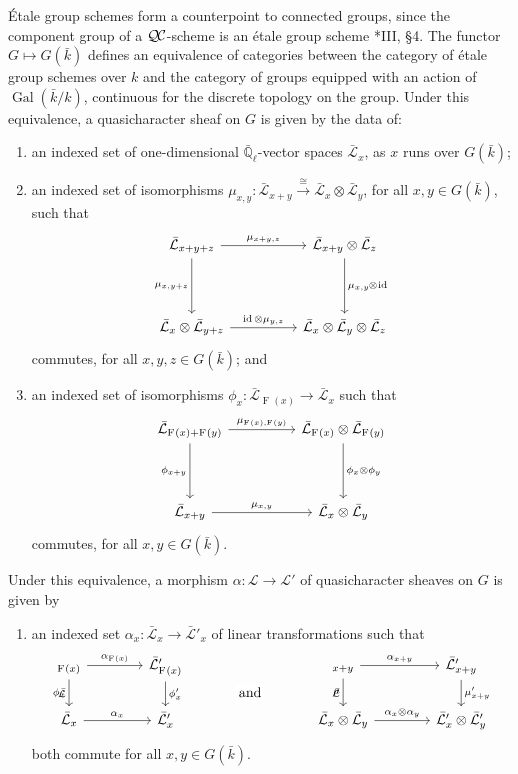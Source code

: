 \documentclass[11pt]{amsart}
\makeatletter
\theoremstyle{plain}
\theoremstyle{definition}
\theoremstyle{remark}
\newcommand{\EE}{\mathbb{\bar Q}_\ell}
\newcommand{\bFq}{\bar{k}}
\newcommand{\Fq}{k}
\DeclareMathOperator{\Gal}{Gal}
\newcommand{\Frob}[1]{\operatorname{F}_{#1}}
\DeclareMathOperator{\id}{id}
\newcommand{\iso}{{\ \cong\ }}
\newcommand{\qcs}[1]{{\mathcal{#1}}}
\newcommand{\gqcs}[1]{{\mathcal{\bar #1}}}
\newcommand{\QC}{{\mathcal{Q\hskip-0.8pt C}}}
\newcommand{\labitem}[2]{%
\def\@itemlabel{\textbf{#1}}
\item
\def\@currentlabel{#1}\label{#2}}
\newcommand{\tight}[3]{\hspace{-#1pt}{#2}\hspace{-#3pt}}
\makeatother
\begin{document}
\'Etale group schemes form a counterpoint to connected groups,
since the component group of a $\QC$-scheme
is an \'etale group scheme \cite{vdGeer-Moonen:AbelianVarieties}*{III, \S 4}.
The functor $G \mapsto G(\bFq)$ defines an equivalence of categories
between the category of \'etale group schemes over $\Fq$ and the category of groups equipped
with an action of $\Gal(\bFq/\Fq)$, continuous for the discrete topology on the group.
Under this equivalence, a quasicharacter sheaf on $G$ is given by the data of:
\begin{enumerate}
 \labitem{(qc.1)}{qc.1} an indexed set of one-dimensional
  $\EE$-vector spaces $\gqcs{L}_x$, as $x$ runs over
  $G(\bFq)$;

 \labitem{(qc.2)}{qc.2} an indexed set of isomorphisms
  $\mu_{x,y} : \gqcs{L}_{x+y} \xrightarrow{\iso} \gqcs{L}_{x} \otimes\gqcs{L}_{y}$,
  for all $x,y \in G(\bFq)$, such that
  \[
   \begin{tikzcd}[row sep=40]
    \gqcs{L}_{x+y+z} \arrow{rr}{\mu_{x+y,z}} \arrow[swap]{d}{\mu_{x,y+z}}
    && \gqcs{L}_{x+y}\otimes\gqcs{L}_{z} \dar{\mu_{x,y} \tight{0.5}{\otimes}{1} \id} \\
    \gqcs{L}_{x} \otimes\gqcs{L}_{y+z} \arrow{rr}{\id \otimes\mu_{y,z}}
    && \gqcs{L}_{x} \otimes\gqcs{L}_{y} \otimes\gqcs{L}_{z}
   \end{tikzcd}
  \]
  commutes, for all $x,y,z\in G(\bFq)$; and
 \labitem{(qc.3)}{qc.3} an indexed set of isomorphisms $\phi_{x} : \gqcs{L}_{\Frob{}(x)} \to \gqcs{L}_x$
  such that
  \[
   \begin{tikzcd}[row sep=40]
    \gqcs{L}_{\Frob{}(x)+\Frob{}(y)} \arrow[swap]{d}{\phi_{x+y}} \arrow{rr}{\mu_{\Frob{}(x),\Frob{}(y)}}
    && \gqcs{L}_{\Frob{}(x)}\otimes\gqcs{L}_{\Frob{}(y)} \dar{\phi_x \tight{0}{\otimes}{0} \phi_y} \\
    \gqcs{L}_{x+y} \arrow{rr}{\mu_{x,y}}
    && \gqcs{L}_x \otimes\gqcs{L}_y
   \end{tikzcd}
  \]
  commutes, for all $x,y\in G(\bFq)$.
\end{enumerate}
Under this equivalence, a morphism $\alpha : \qcs{L} \to \qcs{L'}$ of quasicharacter sheaves on $G$ is given by 
\begin{enumerate}
 \labitem{(qc.4)}{qc.4} an indexed set $\alpha_x : \gqcs{L}_x \to \gqcs{L'}_x$
  of linear transformations such that
  \[
   \begin{tikzcd}[column sep=40]
    \arrow[swap]{d}{\phi_x} \gqcs{L}_{\Frob{}(x)} \rar{\alpha_{\Frob{}(x)}} & \gqcs{L'}_{\Frob{}(x)} \dar{\phi_x'}
    &\arrow[draw=none]{d}[pos=.4,description]{\text{\normalsize{and}}}
    & \arrow[swap]{d}{\mu} \gqcs{L}_{x+y} \rar{\alpha_{x+y}} & \gqcs{L'}_{x+y} \dar{\mu'_{x+y}} \\
    \gqcs{L}_x \rar{\alpha_x} & \gqcs{L'}_x
    & {} & \gqcs{L}_x\otimes\gqcs{L}_y \rar{\alpha_x\otimes\alpha_y} & \gqcs{L'}_x \otimes\gqcs{L'}_y
   \end{tikzcd}
  \]
  both commute for all $x, y \in G(\bFq)$.
\end{enumerate}
\end{document}
